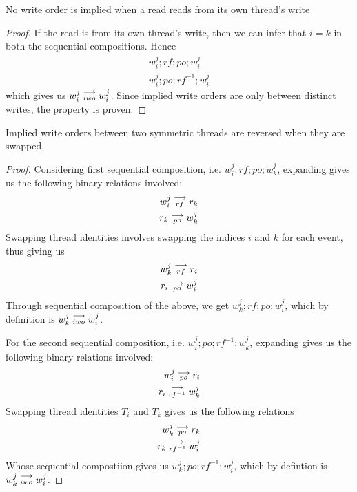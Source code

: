     \begin{property}
        \label{prop2}
        No write order is implied when a read reads from its own thread's write
    \end{property}

    \begin{proof}
        If the read is from its own thread's write, then we can infer that $i=k$ in both the sequential compositions. Hence  
        \begin{align*}
            w_i^j;rf;po;w_i^j \\
            w_i^j;po;rf^{-1};w_i^j
        \end{align*} 
        which gives us $w_i^j\stackrel{\longrightarrow}{_{iwo}}w_i^j$.
        Since implied write orders are only between distinct writes, the property is proven.  
    \end{proof}

        

    \begin{property}
        \label{prop3}
        Implied write orders between two symmetric threads are reversed when they are swapped.
    \end{property}
        
    \begin{proof}
        Considering first sequential composition, i.e. $w_i^j;rf;po;w_k^j$, expanding gives us the following binary relations involved:
        \begin{align*}
            w_i^j\stackrel{\longrightarrow}{_{rf}}r_k \\
            r_k\stackrel{\longrightarrow}{_{po}}w_k^j
        \end{align*}
        Swapping thread identities involves swapping the indices $i$ and $k$ for each event, thus giving us 
        \begin{align*}
            w_k^j\stackrel{\longrightarrow}{_{rf}}r_i \\
            r_i\stackrel{\longrightarrow}{_{po}}w_i^j
        \end{align*}
        Through sequential composition of the above, we get $w_k^j;rf;po;w_i^j$, which by definition is $w_k^j\stackrel{\longrightarrow}{_{iwo}}w_i^j$.

        For the second sequential composition, i.e. $w_i^j;po;rf^{-1};w_k^j$, expanding gives us the following binary relations involved:
        \begin{align*}
            w_i^j\stackrel{\longrightarrow}{_{po}}r_i \\
            r_i\stackrel{\longrightarrow}{_{rf^{-1}}}w_k^j
        \end{align*}
        Swapping thread identities $T_i$ and $T_k$ gives us the following relations 
        \begin{align*}
            w_k^j\stackrel{\longrightarrow}{_{po}}r_k \\
            r_k\stackrel{\longrightarrow}{_{rf^{-1}}}w_i^j
        \end{align*}
        Whose sequential compostiion gives us $w_k^j;po;rf^{-1};w_i^j$, which by defintion is $w_k^j\stackrel{\longrightarrow}{_{iwo}}w_i^j$.
    \end{proof}
        
